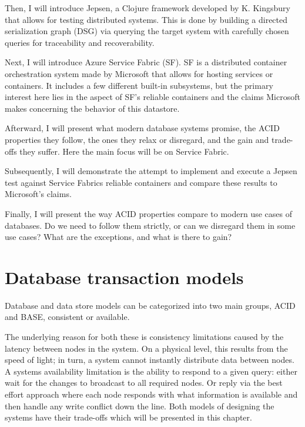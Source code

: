 \documentclass[a4paper,10pt,titlepage]{report}
\begin{document}
    Then, I will introduce Jepsen, a Clojure framework\cite{jepsonio} developed by K. Kingsbury that allows for testing distributed systems. This is done by building a directed serialization graph (DSG) via querying the target system with carefully chosen queries for traceability and recoverability.  \\
    \vspace{5mm}

    Next, I will introduce Azure Service Fabric (SF). SF is a distributed container orchestration system made by Microsoft that allows for hosting services or containers. It includes a few different built-in subsystems, but the primary interest here lies in the aspect of SF's reliable containers and the claims Microsoft makes concerning the behavior of this datastore.\\
    \vspace{5mm}

    Afterward, I will present what modern database systems promise, the ACID properties they follow, the ones they relax or disregard, and the gain and trade-offs they suffer. Here the main focus will be on Service Fabric.\\
    \vspace{5mm}

    Subsequently,  I will demonstrate the attempt to implement and execute a Jepsen test against Service Fabrics reliable containers and compare these results to Microsoft's claims.\\
    \vspace{5mm}

    Finally, I will present the way ACID properties compare to modern use cases of databases. Do we need to follow them strictly, or can we disregard them in some use cases? What are the exceptions, and what is there to gain?\\


    \chapter{Database transaction models}

    Database and data store models can be categorized into two main groups, ACID and BASE, consistent or available.

    The underlying reason for both these is consistency limitations caused by the latency between nodes in the system. On a physical level, this results from the speed of light; in turn, a system cannot instantly distribute data between nodes. A systems availability limitation is the ability to respond to a given query: either wait for the changes to broadcast to all required nodes. Or reply via the best effort approach where each node responds with what information is available and then handle any write conflict down the line. Both models of designing the systems have their trade-offs which will be presented in this chapter.
\end{document}
